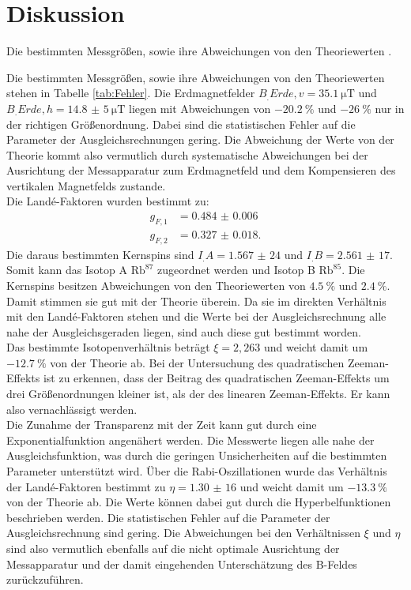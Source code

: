 
\section{Diskussion}
\label{sec:Diskussion}

\begin{table}
	\centering
	\caption{Die bestimmten Messgrößen, sowie ihre Abweichungen von den Theoriewerten \cite{erde,verhaeltnis,V21}.}
	
	\label{tab:Fehler}
\end{table}

\noindent Die bestimmten Messgrößen, sowie ihre Abweichungen von den Theoriewerten stehen in Tabelle \ref{tab:Fehler}. 
Die Erdmagnetfelder $B_.{Erde,v} = \SI{35,1}{\micro\tesla}$ und $B_.{Erde,h}=\SI{14,8(5)}{\micro\tesla}$ liegen mit Abweichungen von $\SI{-20,2}{\%}$ und $\SI{-26}{\%}$ nur in der richtigen Größenordnung. Dabei sind die statistischen Fehler auf die Parameter der Ausgleichsrechnungen gering. Die Abweichung der Werte von der Theorie kommt also vermutlich durch systematische Abweichungen bei der Ausrichtung der Messapparatur zum Erdmagnetfeld und dem Kompensieren des vertikalen Magnetfelds zustande.\\
Die Landé-Faktoren wurden bestimmt zu:
\begin{align*}
g_{F,1} &= \num{0.484(6)}\\
g_{F,2} &= \num{0.327(18)}\text{.}
\end{align*}
Die daraus bestimmten Kernspins sind $I_.A= \num{1,567(24)}$ und $I_.B=\num{2,561(17)}$. Somit kann das Isotop A $\text{Rb}^{87}$ zugeordnet werden und Isotop B $\text{Rb}^{85}$. Die Kernspins besitzen Abweichungen von den Theoriewerten von $\SI{4,5}{\%}$ und $\SI{2,4}{\%}$. Damit stimmen sie gut mit der Theorie überein. Da sie im direkten Verhältnis mit den Landé-Faktoren stehen und die Werte bei der Ausgleichsrechnung alle nahe der Ausgleichsgeraden liegen, sind auch diese gut bestimmt worden.\\
Das bestimmte Isotopenverhältnis beträgt $\xi=2,263$ und weicht damit um $\SI{-12.7}{\%}$ von der Theorie ab.
Bei der Untersuchung des quadratischen Zeeman-Effekts ist zu erkennen, dass der Beitrag des quadratischen Zeeman-Effekts um drei Größenordnungen kleiner ist, als der des linearen Zeeman-Effekts. Er kann also vernachlässigt werden.\\
Die Zunahme der Transparenz mit der Zeit kann gut durch eine Exponentialfunktion angenähert werden. Die Messwerte liegen alle nahe der Ausgleichsfunktion, was durch die geringen Unsicherheiten auf die bestimmten Parameter unterstützt wird. 
Über die Rabi-Oszillationen wurde das Verhältnis der Landé-Faktoren bestimmt zu $\eta=\num{1,30(16)}$ und weicht damit um $\SI{-13.3}{\%}$ von der Theorie ab. Die Werte können dabei gut durch die Hyperbelfunktionen beschrieben werden. Die statistischen Fehler auf die Parameter der Ausgleichsrechnung sind gering. Die Abweichungen bei den Verhältnissen $\xi$ und $\eta$ sind also vermutlich ebenfalls auf die nicht optimale Ausrichtung der Messapparatur und der damit eingehenden Unterschätzung des B-Feldes zurückzuführen. 

